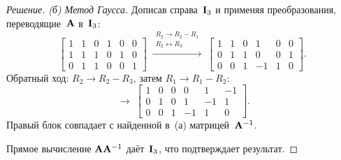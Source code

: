 \begin{proof}[Решение]
\emph{(б) Метод Гаусса.} Дописав справа~$\mathbf{I}_3$ и применяя
преобразования, переводящие~$\mathbf{A}$ в~$\mathbf{I}_3$:
\[
  \left[\begin{array}{rrr|rrr}
    1 & 1 & 0 & 1 & 0 & 0 \\
    1 & 1 & 1 & 0 & 1 & 0 \\
    0 & 1 & 1 & 0 & 0 & 1
  \end{array}\right]
  \;\xrightarrow{\substack{R_2 \to R_2 - R_1 \\ R_2 \leftrightarrow R_3}}\;
  \left[\begin{array}{rrr|rrr}
    1 & 1 & 0 & 1 & 0 & 0 \\
    0 & 1 & 1 & 0 & 0 & 1 \\
    0 & 0 & 1 & -1 & 1 & 0
  \end{array}\right].
\]
Обратный ход: $R_2 \to R_2 - R_3$, затем $R_1 \to R_1 - R_2$:
\[
  \;\longrightarrow\;
  \left[\begin{array}{rrr|rrr}
    1 & 0 & 0 & 0 & 1 & -1 \\
    0 & 1 & 0 & 1 & -1 & 1 \\
    0 & 0 & 1 & -1 & 1 & 0
  \end{array}\right].
\]
Правый блок совпадает с найденной в~(а) матрицей~$\mathbf{A}^{-1}$.

Прямое вычисление $\mathbf{A}\mathbf{A}^{-1}$ даёт~$\mathbf{I}_3$, что
подтверждает результат.
\end{proof}
